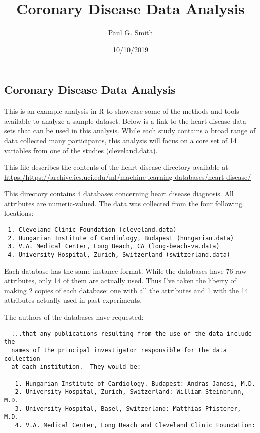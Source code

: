\documentclass[]{article}
\title{Coronary Disease Data Analysis}
\author{Paul G. Smith}
\date{10/10/2019}
\begin{document}
\maketitle

\hypertarget{coronary-disease-data-analysis}{%
\subsection{Coronary Disease Data
Analysis}\label{coronary-disease-data-analysis}}

This is an example analysis in R to showcase some of the methods and
tools available to analyze a sample dataset. Below is a link to the
heart disease data sets that can be used in this analysis. While each
study contains a broad range of data collected many participants, this
analysis will focus on a core set of 14 variables from one of the
studies (cleveland.data).

This file describes the contents of the heart-disease directory
available at
\url{https:/https://archive.ics.uci.edu/ml/machine-learning-databases/heart-disease/}

This directory contains 4 databases concerning heart disease diagnosis.
All attributes are numeric-valued. The data was collected from the four
following locations:

\begin{verbatim}
 1. Cleveland Clinic Foundation (cleveland.data)
 2. Hungarian Institute of Cardiology, Budapest (hungarian.data)
 3. V.A. Medical Center, Long Beach, CA (long-beach-va.data)
 4. University Hospital, Zurich, Switzerland (switzerland.data)
\end{verbatim}

Each database has the same instance format. While the databases have 76
raw attributes, only 14 of them are actually used. Thus I've taken the
liberty of making 2 copies of each database: one with all the attributes
and 1 with the 14 attributes actually used in past experiments.

The authors of the databases have requested:

\begin{verbatim}
  ...that any publications resulting from the use of the data include the 
  names of the principal investigator responsible for the data collection
  at each institution.  They would be:

   1. Hungarian Institute of Cardiology. Budapest: Andras Janosi, M.D.
   2. University Hospital, Zurich, Switzerland: William Steinbrunn, M.D.
   3. University Hospital, Basel, Switzerland: Matthias Pfisterer, M.D.
   4. V.A. Medical Center, Long Beach and Cleveland Clinic Foundation:
 
\end{verbatim}
\end{document}
